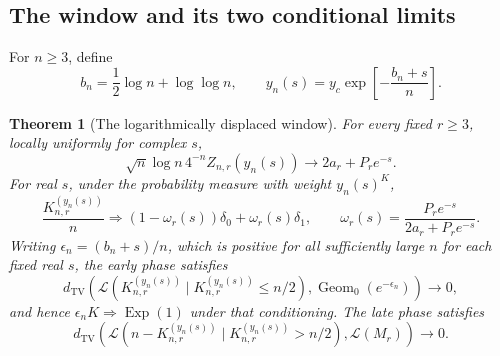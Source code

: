 \documentclass[11pt]{article}
\numberwithin{equation}{section}
\newtheorem{theorem}{Theorem}[section]
\theoremstyle{definition}
\newcommand{\Law}{\mathcal L}
\newcommand{\Geom}{\operatorname{Geom}_0}
\newcommand{\Exp}{\operatorname{Exp}}
\newcommand{\TV}{d_{\mathrm{TV}}}
\begin{document}
\subsection{The window and its two conditional limits}

For \(n\ge3\), define
\begin{equation}\label{fpf:lp:eq:window-param}
 b_n=\frac12\log n+\log\log n,\qquad
 y_n(s)=y_c\exp\!\left[-\frac{b_n+s}{n}\right].
\end{equation}

\begin{theorem}[The logarithmically displaced window]\label{fpf:lp:thm:window}
For every fixed \(r\ge3\), locally uniformly for complex \(s\),
\begin{equation}\label{fpf:lp:eq:window-Z}
 \boxed{\displaystyle
 \sqrt n\log n\,4^{-n}Z_{n,r}(y_n(s))
 \longrightarrow 2a_r+P_r e^{-s}.}
\end{equation}
For real \(s\), under the probability measure with weight \(y_n(s)^K\),
\begin{equation}\label{fpf:lp:eq:mixture}
 \frac{K_{n,r}^{(y_n(s))}}n
 \Rightarrow (1-\omega_r(s))\delta_0+\omega_r(s)\delta_1,
 \qquad
 \omega_r(s)=\frac{P_re^{-s}}{2a_r+P_re^{-s}}.
\end{equation}
Writing \(\epsilon_n=(b_n+s)/n\), which is positive for all sufficiently
large \(n\) for each fixed real \(s\), the early phase satisfies
\begin{equation}\label{fpf:lp:eq:early}
 \TV\!\left(
 \Law(K_{n,r}^{(y_n(s))}\mid K_{n,r}^{(y_n(s))}\le n/2),
 \Geom(e^{-\epsilon_n})\right)\longrightarrow0,
\end{equation}
and hence \(\epsilon_n K\Rightarrow\Exp(1)\) under that conditioning.
The late phase satisfies
\begin{equation}\label{fpf:lp:eq:late}
 \TV\!\left(
 \Law(n-K_{n,r}^{(y_n(s))}\mid K_{n,r}^{(y_n(s))}>n/2),
 \Law(M_r)\right)\longrightarrow0.
\end{equation}
\end{theorem}
\end{document}
